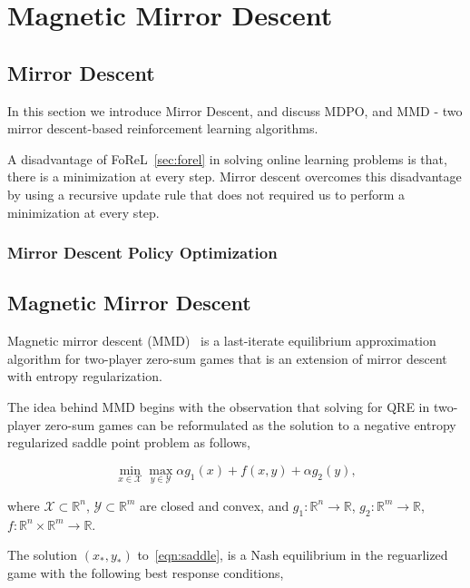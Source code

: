 \chapter{Magnetic Mirror Descent}

\section{Mirror Descent}

In this section we introduce Mirror Descent, and discuss MDPO, and MMD - two mirror descent-based
reinforcement learning algorithms.

A disadvantage of FoReL~\ref{sec:forel} in solving online learning problems is that, there is a
minimization at every step.
Mirror descent overcomes this disadvantage by using a recursive update rule that does not required
us to perform a minimization at every step.

\subsection[MDPO]{Mirror Descent Policy
	Optimization}

\section[MMD]{Magnetic Mirror Descent}

Magnetic mirror descent (MMD)~\cite{sokotaUnified2023} is a last-iterate equilibrium approximation
algorithm for two-player zero-sum games that is an extension of mirror descent with entropy
regularization.

The idea behind MMD begins with the observation that solving for QRE in two-player zero-sum games
can be reformulated as the solution to a negative entropy regularized saddle point problem as
follows,

\begin{equation}
	\label{eqn:saddle} \min_{x \in \mathcal{X}} \max_{y
		\in \mathcal{Y}} \alpha g_1(x) + f(x, y) + \alpha g_2(y),
\end{equation}

where
$\mathcal{X} \subset \mathbb{R}^n$, $\mathcal{Y} \subset \mathbb{R}^m$ are closed and convex, and
$g_1: \mathbb{R}^n \rightarrow \mathbb{R}$, $g_2: \mathbb{R}^m \rightarrow \mathbb{R}$, $f :
	\mathbb{R}^n \times \mathbb{R}^m \rightarrow \mathbb{R}$.

The solution $(x_{\ast}, y_{\ast})$ to~\ref{eqn:saddle}, is a Nash equilibrium in the reguarlized
game with the following best response conditions,

